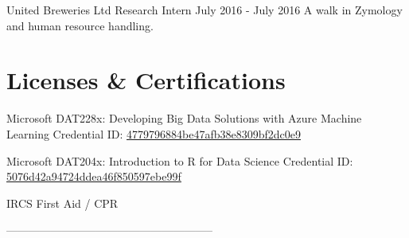 \documentclass[]{cv-style}          %
\begin{document}
\begin{entrylist}
\entry
{United Breweries Ltd}
{Research Intern}
{July 2016 - July 2016}
{A walk in Zymology and human resource handling. }
{\vspace{-0.3cm}}
\end{entrylist}




\section{Licenses \& Certifications}

\begin{entrylist}
\entry
{Microsoft}
{DAT228x: Developing Big Data Solutions with Azure Machine Learning}
{}
{Credential ID: \href{https://courses.edx.org/certificates/4779796884be47afb38e8309bf2dc0e9}{\underline{4779796884be47afb38e8309bf2dc0e9}}}


\end{entrylist} 
\begin{entrylist}
\entry
{Microsoft}
{DAT204x: Introduction to R for Data Science}
{}
{Credential ID: \href{https://courses.edx.org/certificates/5076d42a94724ddea46f850597ebe99f}{\underline{5076d42a94724ddea46f850597ebe99f}}}


\end{entrylist}
\begin{entrylist}
\entry
{IRCS}
{First Aid / CPR}
{}
{}
\end{entrylist}


--------------------------------------------------------
\end{document}
